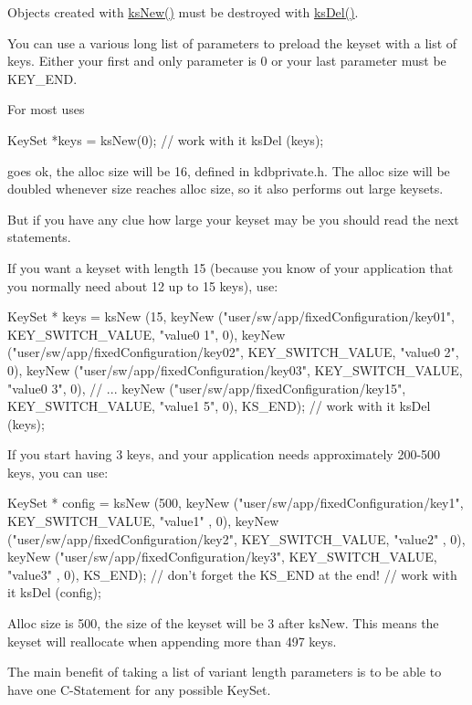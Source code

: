 Objects created with \hyperlink{group__keyset_ga671e1aaee3ae9dc13b4834a4ddbd2c3c}{ksNew()} must be destroyed with \hyperlink{group__keyset_ga27e5c16473b02a422238c8d970db7ac8}{ksDel()}.

You can use a various long list of parameters to preload the keyset with a list of keys. Either your first and only parameter is 0 or your last parameter must be KEY\_\-END.

For most uses 
\begin{DoxyCode}
KeySet *keys = ksNew(0);
// work with it
ksDel (keys);
\end{DoxyCode}
 goes ok, the alloc size will be 16, defined in kdbprivate.h. The alloc size will be doubled whenever size reaches alloc size, so it also performs out large keysets.

But if you have any clue how large your keyset may be you should read the next statements.

If you want a keyset with length 15 (because you know of your application that you normally need about 12 up to 15 keys), use: 
\begin{DoxyCode}
KeySet * keys = ksNew (15,
        keyNew ("user/sw/app/fixedConfiguration/key01", KEY_SWITCH_VALUE, "value0
      1", 0),
        keyNew ("user/sw/app/fixedConfiguration/key02", KEY_SWITCH_VALUE, "value0
      2", 0),
        keyNew ("user/sw/app/fixedConfiguration/key03", KEY_SWITCH_VALUE, "value0
      3", 0),
        // ...
        keyNew ("user/sw/app/fixedConfiguration/key15", KEY_SWITCH_VALUE, "value1
      5", 0),
        KS_END);
// work with it
ksDel (keys);
\end{DoxyCode}


If you start having 3 keys, and your application needs approximately 200-\/500 keys, you can use: 
\begin{DoxyCode}
KeySet * config = ksNew (500,
        keyNew ("user/sw/app/fixedConfiguration/key1", KEY_SWITCH_VALUE, "value1"
      , 0),
        keyNew ("user/sw/app/fixedConfiguration/key2", KEY_SWITCH_VALUE, "value2"
      , 0),
        keyNew ("user/sw/app/fixedConfiguration/key3", KEY_SWITCH_VALUE, "value3"
      , 0),
        KS_END); // don't forget the KS_END at the end!
// work with it
ksDel (config);
\end{DoxyCode}
 Alloc size is 500, the size of the keyset will be 3 after ksNew. This means the keyset will reallocate when appending more than 497 keys.

The main benefit of taking a list of variant length parameters is to be able to have one C-\/Statement for any possible KeySet.

